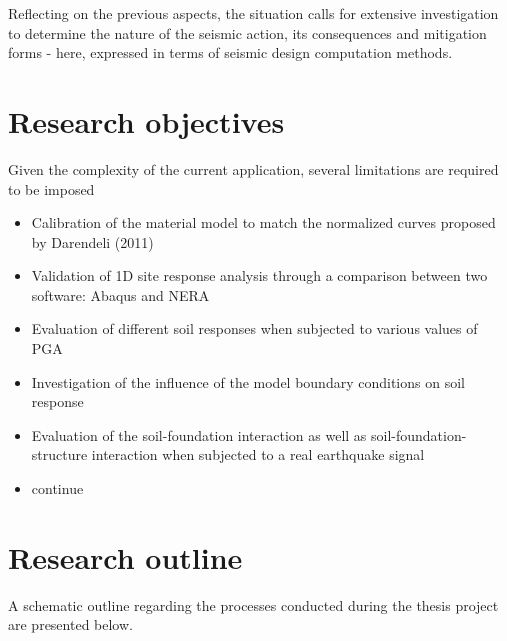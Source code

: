 \documentclass[10pt,a4paper]{report}
\begin{document}
Reflecting on the previous aspects, the situation calls for extensive investigation to determine the nature of the seismic action, its consequences and mitigation forms - here, expressed in terms of seismic design computation methods. 

\section{Research objectives}
Given the complexity of the current application, several limitations are required to be imposed
\begin{itemize}
	\item Calibration of the material model to match the normalized curves proposed by Darendeli (2011)\\
	\item Validation of 1D site response analysis through a comparison between two software: Abaqus and NERA
	\item Evaluation of different soil responses when subjected to various values of PGA
	\item Investigation of the influence of the model boundary conditions on soil response
	\item Evaluation of the soil-foundation interaction as well as soil-foundation-structure interaction when subjected to a real earthquake signal
	\item continue
\end{itemize}

\section{Research outline}
A schematic outline regarding the processes conducted during the thesis project are presented below. 
\end{document}
